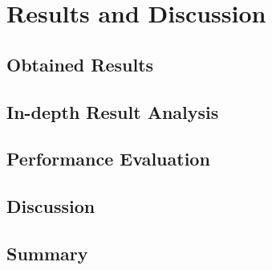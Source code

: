 \chapter{Results and Discussion}
\label{ch:results}


\section{Obtained Results}
\label{sec:obtained-results}

\section{In-depth Result Analysis}
\label{sec:indepth}

\section{Performance Evaluation}
\label{sec:performance}

\section{Discussion}
\label{sec:discussion}

\section{Summary}
\label{sec:results-summary}
